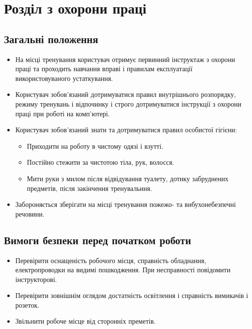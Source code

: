 \section{Розділ з охорони праці}
\subsection{Загальні положення}
\begin{itemize}
  \item На місці тренування користувач отримує первинний інструктаж з охорони праці
    та проходить навчання вправі і правилам експлуатації використовуваного устаткування.
  \item Користувач зобов'язаний дотримуватися правил внутрішнього розпорядку,
    режиму тренувань і відпочинку і строго дотримуватися інструкції з охорони праці
    при роботі на комп’ютері.
  \item Користувач зобов'язаний знати та дотримуватися правил особистої гігієни:
    \begin{itemize}
      \item Приходити на роботу в чистому одязі і взутті.
      \item Постійно стежити за чистотою тіла, рук, волосся.
      \item Мити руки з милом після відвідування туалету,
        дотику забруднених предметів, після закінчення тренувальння.
    \end{itemize}
  \item Забороняється зберігати на місці тренування
    пожежо- та вибухонебезпечні речовини.
\end{itemize}
\newpage
\subsection{Вимоги безпеки перед початком роботи}
\begin{itemize}
  \item Перевірити оснащеність робочого місця, справність обладнання,
    електропроводки на видимі пошкодження. При несправності
    повідомити інструкторові.
  \item Перевірити зовнішнім оглядом достатність освітлення
    і справність вимикачів і розеток.
  \item Звільнити робоче місце від сторонніх преметів.
\end{itemize}
\newpage
